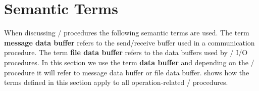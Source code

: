 \section{Semantic Terms}
\label{terms:semantic}

When discussing \MPI/ procedures the following semantic terms are
used.  The term \textbf{message data buffer} refers to the send/receive
buffer used in a communication procedure.  The term
\textbf{file data buffer} refers to the data buffers used by \MPI/ I/O
procedures. In this section we use the term \textbf{data buffer} and
depending on the \MPI/ procedure it will refer to message data buffer
or file data buffer.
 shows how the terms defined in
this section apply to all operation-related \MPI/ procedures.

